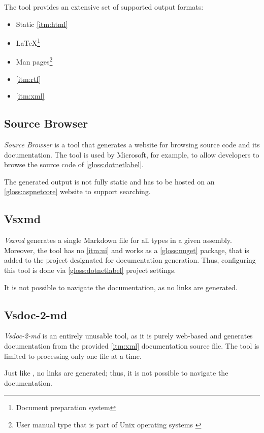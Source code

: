 The tool provides an extensive set of supported output formats:
\begin{itemize}
    \item Static \ref{itm:html}
    \item \LaTeX\footnote{Document preparation system}
    \item Man pages\footnote{User manual type that is part of Unix operating systems \cite{credocs_limited_latex_2022}}
    \item \ref{itm:rtf}
    \item \ref{itm:xml}
\end{itemize}

\subsection{Source Browser}

\textit{Source Browser} is a tool that generates a website for browsing source code and its documentation. The tool is used by Microsoft, for example, to allow developers to browse the source code of \ref{gloss:dotnetlabel}.

The generated output is not fully static and has to be hosted on an \ref{gloss:aspnetcore} website to support searching.

\subsection{Vsxmd} \label{ssec:vsxmd}

\textit{Vsxmd} generates a single Markdown file for all types in a given assembly. Moreover, the tool has no \ref{itm:ui} and works as a \ref{gloss:nuget} package, that is added to the project designated for documentation generation. Thus, configuring this tool is done via \ref{gloss:dotnetlabel} project settings.

It is not possible to navigate the documentation, as no links are generated.

\subsection{Vsdoc-2-md}

\textit{Vsdoc-2-md} is an entirely unusable tool, as it is purely web-based and generates documentation from the provided \ref{itm:xml} documentation source file. The tool is limited to processing only one file at a time.

Just like \textit{}, no links are generated; thus, it is not possible to navigate the documentation.